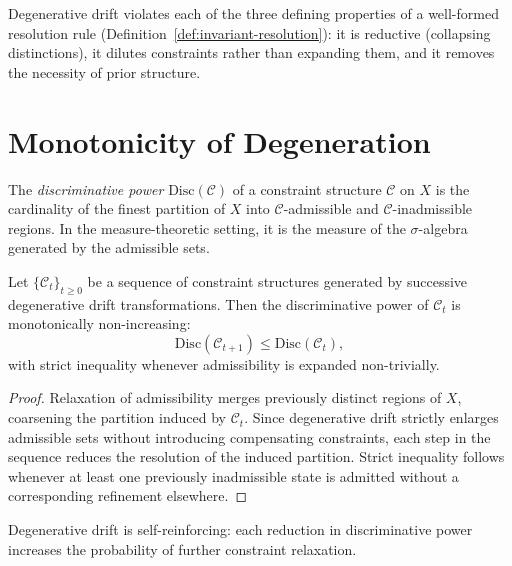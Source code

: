 \documentclass[11pt,openany]{book}
\begin{document}
\begin{remark}
Degenerative drift violates each of the three defining
properties of a well-formed resolution rule
(Definition~\ref{def:invariant-resolution}): it is
reductive (collapsing distinctions), it dilutes constraints
rather than expanding them, and it removes the necessity
of prior structure.
\end{remark}

\section{Monotonicity of Degeneration}
\label{sec:monotonicity}

\begin{definition}
\label{def:discriminative-power}
The \emph{discriminative power} $\mathrm{Disc}(\mathcal{C})$
of a constraint structure $\mathcal{C}$ on $X$ is the
cardinality of the finest partition of $X$ into
$\mathcal{C}$-admissible and $\mathcal{C}$-inadmissible
regions.  In the measure-theoretic setting, it is the
measure of the $\sigma$-algebra generated by the admissible
sets.
\end{definition}

\begin{theorem}
\label{thm:monotonic-degeneration}
Let $\{\mathcal{C}_t\}_{t \ge 0}$ be a sequence of
constraint structures generated by successive degenerative
drift transformations.  Then the discriminative power of
$\mathcal{C}_t$ is monotonically non-increasing:
\[
  \mathrm{Disc}(\mathcal{C}_{t+1}) \le
  \mathrm{Disc}(\mathcal{C}_t),
\]
with strict inequality whenever admissibility is expanded
non-trivially.
\end{theorem}

\begin{proof}
Relaxation of admissibility merges previously distinct
regions of $X$, coarsening the partition induced by
$\mathcal{C}_t$.  Since degenerative drift strictly enlarges
admissible sets without introducing compensating constraints,
each step in the sequence reduces the resolution of the
induced partition.  Strict inequality follows whenever at
least one previously inadmissible state is admitted without
a corresponding refinement elsewhere.
\end{proof}

\begin{corollary}
\label{cor:self-reinforcing}
Degenerative drift is self-reinforcing: each reduction in
discriminative power increases the probability of further
constraint relaxation.
\end{corollary}
\end{document}
